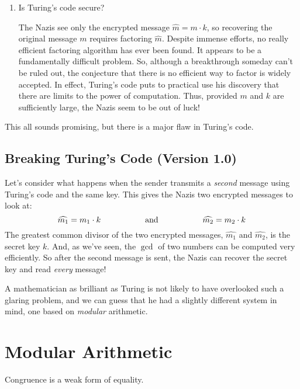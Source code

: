 \begin{enumerate}
\item Is Turing's code secure?

The Nazis see only the encrypted message $\widehat{m} = m \cdot k$, so
recovering the original message $m$ requires factoring $\widehat{m}$.  Despite
immense efforts, no really efficient factoring algorithm has ever been
found.  It appears to be a fundamentally difficult problem.  So,
although a breakthrough someday can't be ruled out, the conjecture
that there is no efficient way to factor is widely accepted.  In
effect, Turing's code puts to practical use his discovery that there
are limits to the power of computation.  Thus, provided $m$ and $k$
are sufficiently large, the Nazis seem to be out of luck!

\end{enumerate}

This all sounds promising, but there is a major flaw in Turing's code.

\subsection{Breaking Turing's Code (Version 1.0)}

Let's consider what happens when the sender transmits a \emph{second}
message using Turing's code and the same key.  This gives the Nazis
two encrypted messages to look at:
\[
\widehat{m_1} = m_1 \cdot k
\hspace{0.75in} \text{and} \hspace{0.75in} \widehat{m_2} = m_2 \cdot k
\]
The greatest common divisor of the two encrypted messages, $\widehat{m_1}$ and
$\widehat{m_2}$, is the secret key $k$.  And, as we've seen, the $\gcd$ of two
numbers can be computed very efficiently.  So after the second message
is sent, the Nazis can recover the secret key and read \emph{every}
message!

A mathematician as brilliant as Turing is not likely to have
overlooked such a glaring problem, and we can guess that he had a
slightly different system in mind, one based on \emph{modular}
arithmetic.

\section{Modular Arithmetic}\label{modular_arithmeric_sec}

\begin{editingnotes}
Congruence is a weak form of equality.
\end{editingnotes}

